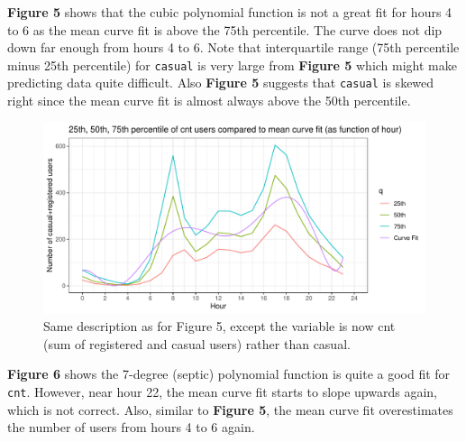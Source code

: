 \documentclass[
]{article}
\begin{document}
\textbf{Figure 5} shows that the cubic polynomial function is not a
great fit for hours 4 to 6 as the mean curve fit is above the 75th
percentile. The curve does not dip down far enough from hours 4 to 6.
Note that interquartile range (75th percentile minus 25th percentile)
for \texttt{casual} is very large from \textbf{Figure 5} which might
make predicting data quite difficult. Also \textbf{Figure 5} suggests
that \texttt{casual} is skewed right since the mean curve fit is almost
always above the 50th percentile.

\newpage

\begin{figure}
\centering
\includegraphics{LeastSquares_files/figure-latex/unnamed-chunk-13-1.pdf}
\caption{Same description as for Figure 5, except the variable is now
cnt (sum of registered and casual users) rather than casual.}
\end{figure}

\textbf{Figure 6} shows the 7-degree (septic) polynomial function is
quite a good fit for \texttt{cnt}. However, near hour 22, the mean curve
fit starts to slope upwards again, which is not correct. Also, similar
to \textbf{Figure 5}, the mean curve fit overestimates the number of
users from hours 4 to 6 again.
\end{document}
